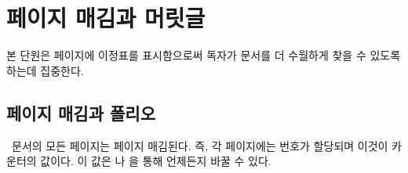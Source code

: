 \chapter{페이지 매김과 머릿글} \label{chap:pagination}


본 단원은 페이지에 이정표를 표시함으로써 독자가 문서를 더 수월하게 찾을 수
있도록 하는데 집중한다.

\section{페이지 매김과 폴리오}

\ltx\ 문서의 모든 페이지는 페이지 매김된다.
즉, 각 페이지에는 번호가 할당되며 이것이  카운터의 값이다.
이 값은 \cmd{\setcounter}나
\cmd{\addtocounter}을 통해 언제든지 바꿀 수 있다.

